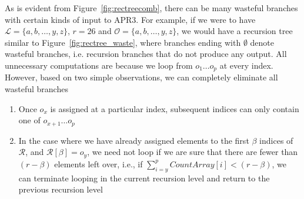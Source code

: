 \documentclass{article}
\begin{document}
As is evident from Figure~\ref{fig:rectreecomb}, there can be many wasteful branches with certain kinds of input to APR3. For example, if we were to have $\mathcal{L} = \{a,b,\ldots,y,z\}$, $r=26$ and $\mathcal{O} = \{a,b,\ldots,y,z\}$, we would have a recursion tree similar to Figure~\ref{fig:rectree_waste}, where branches ending with $\emptyset$ denote wasteful branches, i.e. recursion branches that do not produce any output. All unnecessary computations are because we loop from $o_1 \ldots o_p$ at every index. However, based on two simple observations, we can completely eliminate all wasteful branches
\begin{enumerate}
 \item Once $o_x$ is assigned at a particular index, subsequent indices can only contain one of $o_{x+1} \ldots o_p$
 \item In the case where we have already assigned elements to the first $\beta$ indices of $\mathcal{R}$, and $\mathcal{R}[\beta] = o_y$, we need not loop if we are sure that there are fewer than $(r - \beta)$ elements left over, i.e., if $\sum_{i=y}^p CountArray[i] < (r - \beta)$, we can terminate looping in the current recursion level and return to the previous recursion level
\end{enumerate}
\end{document}
